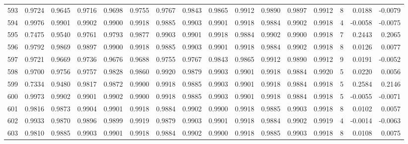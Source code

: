 \begin{tabular}{lrrrrrrrrrrrrrrr}
593 &      0.9724 &  0.9645 &  0.9716 &  0.9698 &  0.9755 &  0.9767 &  0.9843 &  0.9865 &  0.9912 &  0.9890 &   0.9897 &     0.9912 &      8 &                    0.0188 &                    -0.0079 \\
594 &      0.9976 &  0.9901 &  0.9902 &  0.9900 &  0.9918 &  0.9885 &  0.9903 &  0.9901 &  0.9918 &  0.9884 &   0.9902 &     0.9918 &      4 &                   -0.0058 &                    -0.0075 \\
595 &      0.7475 &  0.9540 &  0.9761 &  0.9793 &  0.9877 &  0.9903 &  0.9901 &  0.9918 &  0.9884 &  0.9902 &   0.9900 &     0.9918 &      7 &                    0.2443 &                     0.2065 \\
596 &      0.9792 &  0.9869 &  0.9897 &  0.9900 &  0.9918 &  0.9885 &  0.9903 &  0.9901 &  0.9918 &  0.9884 &   0.9902 &     0.9918 &      8 &                    0.0126 &                     0.0077 \\
597 &      0.9721 &  0.9669 &  0.9736 &  0.9676 &  0.9688 &  0.9755 &  0.9767 &  0.9843 &  0.9865 &  0.9912 &   0.9890 &     0.9912 &      9 &                    0.0191 &                    -0.0052 \\
598 &      0.9700 &  0.9756 &  0.9757 &  0.9828 &  0.9860 &  0.9920 &  0.9879 &  0.9903 &  0.9901 &  0.9918 &   0.9884 &     0.9920 &      5 &                    0.0220 &                     0.0056 \\
599 &      0.7334 &  0.9480 &  0.9817 &  0.9872 &  0.9900 &  0.9918 &  0.9885 &  0.9903 &  0.9901 &  0.9918 &   0.9884 &     0.9918 &      5 &                    0.2584 &                     0.2146 \\
600 &      0.9973 &  0.9902 &  0.9901 &  0.9902 &  0.9900 &  0.9918 &  0.9885 &  0.9903 &  0.9901 &  0.9918 &   0.9884 &     0.9918 &      5 &                   -0.0055 &                    -0.0071 \\
601 &      0.9816 &  0.9873 &  0.9904 &  0.9901 &  0.9918 &  0.9884 &  0.9902 &  0.9900 &  0.9918 &  0.9885 &   0.9903 &     0.9918 &      8 &                    0.0102 &                     0.0057 \\
602 &      0.9933 &  0.9870 &  0.9896 &  0.9899 &  0.9919 &  0.9879 &  0.9903 &  0.9901 &  0.9918 &  0.9884 &   0.9902 &     0.9919 &      4 &                   -0.0014 &                    -0.0063 \\
603 &      0.9810 &  0.9885 &  0.9903 &  0.9901 &  0.9918 &  0.9884 &  0.9902 &  0.9900 &  0.9918 &  0.9885 &   0.9903 &     0.9918 &      8 &                    0.0108 &                     0.0075 \\

\end{tabular}
